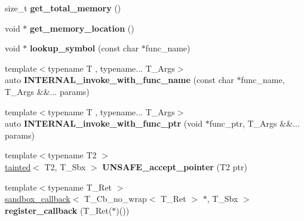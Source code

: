 \begin{DoxyCompactItemize}
\mbox{\label{classrlbox_1_1rlbox__sandbox_a9bfda00c80c73e70ddbc3f2419066cb8}} 
size\+\_\+t {\bfseries get\+\_\+total\+\_\+memory} ()
\item 
\mbox{\label{classrlbox_1_1rlbox__sandbox_af682f225ef74ad07cfa5c25e7c8ed42c}} 
void $\ast$ {\bfseries get\+\_\+memory\+\_\+location} ()
\item 
\mbox{\label{classrlbox_1_1rlbox__sandbox_a38b2f18b1db0dbd789477a93d0dc40eb}} 
void $\ast$ {\bfseries lookup\+\_\+symbol} (const char $\ast$func\+\_\+name)
\item 
\mbox{\label{classrlbox_1_1rlbox__sandbox_a9f9e13680f09205f25a520fc04ef3f9a}} 
{\footnotesize template$<$typename T , typename... T\+\_\+\+Args$>$ }\\auto {\bfseries I\+N\+T\+E\+R\+N\+A\+L\+\_\+invoke\+\_\+with\+\_\+func\+\_\+name} (const char $\ast$func\+\_\+name, T\+\_\+\+Args \&\&... params)
\item 
\mbox{\label{classrlbox_1_1rlbox__sandbox_aa9949431e81241554f6b54fa7bcaca19}} 
{\footnotesize template$<$typename T , typename... T\+\_\+\+Args$>$ }\\auto {\bfseries I\+N\+T\+E\+R\+N\+A\+L\+\_\+invoke\+\_\+with\+\_\+func\+\_\+ptr} (void $\ast$func\+\_\+ptr, T\+\_\+\+Args \&\&... params)
\item 
\mbox{\label{classrlbox_1_1rlbox__sandbox_acd10ff63b848c01690ba1f8977621a72}} 
{\footnotesize template$<$typename T2 $>$ }\\\hyperlink{classrlbox_1_1tainted}{tainted}$<$ T2, T\+\_\+\+Sbx $>$ {\bfseries U\+N\+S\+A\+F\+E\+\_\+accept\+\_\+pointer} (T2 ptr)
\item 
\mbox{\label{classrlbox_1_1rlbox__sandbox_ad2cf7d6b28eca1cdc04cb3cbee338189}} 
{\footnotesize template$<$typename T\+\_\+\+Ret $>$ }\\\hyperlink{classrlbox_1_1sandbox__callback}{sandbox\+\_\+callback}$<$ T\+\_\+\+Cb\+\_\+no\+\_\+wrap$<$ T\+\_\+\+Ret $>$ $\ast$, T\+\_\+\+Sbx $>$ {\bfseries register\+\_\+callback} (T\+\_\+\+Ret($\ast$)())
\item 

\end{DoxyCompactItemize}
